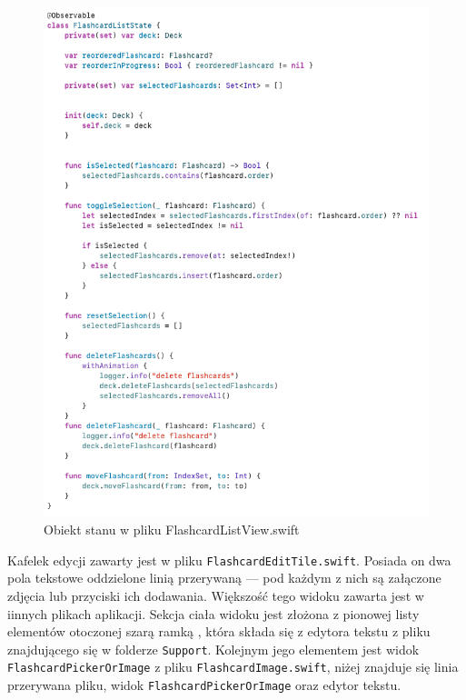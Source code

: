 \documentclass[final,a4paper,openany,12pt]{mwbk}
\begin{document}
\begin{figure}[H]
    \centering
    \includegraphics[width=0.7\linewidth]{img/flashcardliststate1.png}
    \caption{Obiekt stanu w pliku FlashcardListView.swift}
    \label{fig:flashcardliststate1}
\end{figure}


Kafelek edycji zawarty jest w pliku \texttt{FlashcardEditTile.swift}. Posiada on dwa pola tekstowe oddzielone linią przerywaną --- pod każdym z nich są załączone zdjęcia lub przyciski ich dodawania. Większość tego widoku zawarta jest w iinnych plikach aplikacji. Sekcja ciała widoku jest złożona z pionowej listy elementów otoczonej szarą ramką , która składa się z edytora tekstu z pliku znajdującego się w folderze \texttt{Support}. Kolejnym jego elementem jest widok \texttt{FlashcardPickerOrImage} z pliku \texttt{FlashcardImage.swift}, niżej znajduje się linia przerywana pliku, widok \texttt{FlashcardPickerOrImage} oraz edytor tekstu.
\end{document}
